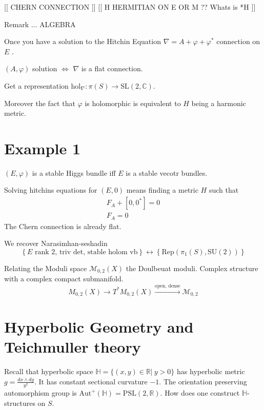 [[ CHERN CONNECTION ]] [[ H HERMITIAN ON E OR M ?? Whats is *H ]]


Remark ... 
ALGEBRA 

Once you have a solution to the Hitchin Equation 
$\nabla = A +\varphi + \varphi^* $ connection on $E$ . 

$(A, \varphi)$ solution $\Leftrightarrow$ $\nabla $ is a flat connection. 

Get a representation $ \mathrm{hol}_\nabla : \pi(S) \rightarrow \mathrm{SL}(2, \mathbb{C} ) $. 

Moreover the fact that $ \varphi$ is holomorphic is equivalent to $H$ being a harmonic metric. 



 

\section{Example 1} %

$(E, \varphi)$ is a stable Higgs bundle iff $E$ is a stable vecotr bundles. 

Solving hitchins equations for $ (E, 0 ) $ means finding a metric $H$ such that 
\begin{align}
    F_A + [0,0^*] = 0 \\
    F_A = 0 
\end{align}
The Chern connection is already flat. 

We recover Narasimhan-seshadin
\begin{equation}
    \left\{ E \mbox{ rank 2, triv det, stable holom vb} \right\} \leftrightarrow 
    \left\{ \mathrm{Rep}( \pi_1 ( S) , \mathrm{SU}(2) ) \right\} 
\end{equation}

Relating the Moduli space $ \mathcal{M} _{0,2} (X)$ the Doulbeuat moduli. 
Complex structure with a complex compact submanifold. 
\begin{equation}
    M_{0,2} (X) \rightarrow T^* M_{0,2} (X) \xrightarrow{ \mbox{open, dense} } \mathcal{M} _{0,2}
\end{equation}



\section{Hyperbolic Geometry and Teichmuller theory} %

Recall that hyperbolic space $ \mathbb{H} = \{ (x,y) \in \mathbb{R}  |~ y> 0 \} $
has hyperbolic metric $ g = \frac{dx \wedge dy }{ y^2} $.
It has constant sectional curvature $-1$. 
The orientation preserving automorphism group is $ \mathrm{Aut}^+ ( \mathbb{H} ) = \mathrm{PSL}(2, \mathbb{R} ) $. 
How does one construct $ \mathbb{H}$-structures on $S $. 

